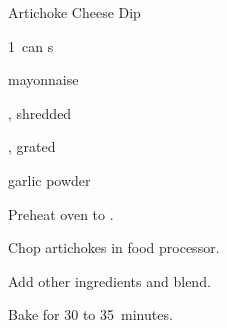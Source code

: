 \begin{recipe}{Artichoke Cheese Dip}{}{}

\begin{ingredients}
\item 1~can s
\item {} mayonnaise
\item \C{1\half} , shredded
\item {} , grated
\item {} garlic powder
\end{ingredients}

\begin{directions}
\item Preheat oven to .
\item Chop artichokes in food processor.
\item Add other ingredients and blend.
\item Bake for 30 to 35~minutes.
\end{directions}

\end{recipe}
